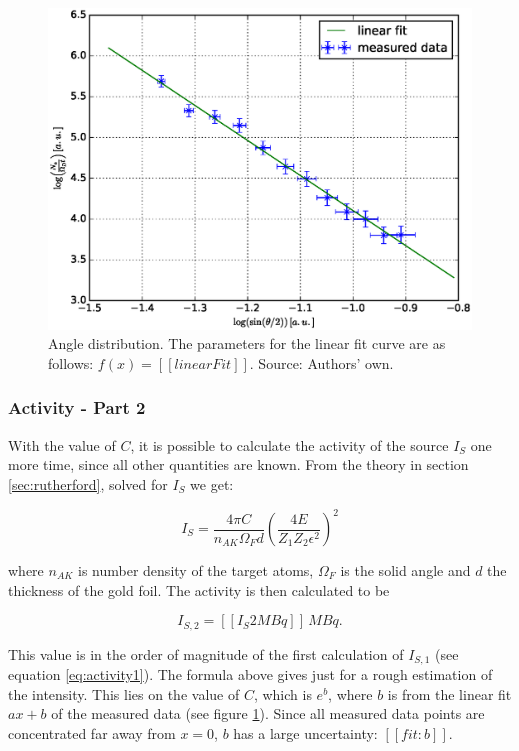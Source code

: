 \documentclass[a4paper]{article}
\begin{document}
\begin{figure}[H]
\centering
\includegraphics[width=1.0\textwidth]{plots/angle_distribution.eps}
\caption{Angle distribution. The parameters for the linear fit curve are as follows: $f(x) = [[linearFit]]$. Source: Authors' own.}
\label{fig:angleDistribution}
\end{figure}

\subsubsection{Activity - Part 2}

With the value of $C$, it is possible to calculate the activity of the source $I_S$ one more time, since all other quantities are known. From the theory in section \ref{sec:rutherford}, solved for $I_S$ we get:

\begin{equation}
I_S = \frac{4 \pi C}{n_{AK} \Omega_F d} \left( \frac{4 E}{Z_1 Z_2 \epsilon^2} \right)^2
\end{equation}

where $n_{AK}$ is number density of the target atoms, $\Omega_F$ is the solid angle and $d$ the thickness of the gold foil. The activity is then calculated to be

\begin{equation}
I_{S,2} = [[I_S2MBq]] \, MBq. \label{eq:activity2}
\end{equation}

This value is in the order of magnitude of the first calculation of $I_{S,1}$ (see equation \eqref{eq:activity1}). The formula above gives just for a rough estimation of the intensity. This lies on the value of $C$, which is $e^b$, where $b$ is from the linear fit $a x + b$ of the measured data (see figure \ref{fig:angleDistribution}). Since all measured data points are concentrated far away from $x = 0$, $b$ has a large uncertainty: $[[fit:b]]$.
\end{document}
